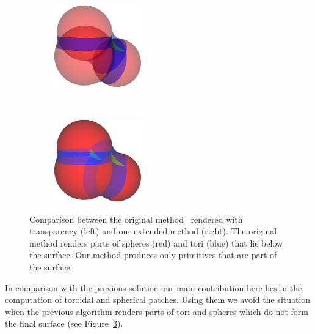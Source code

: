\begin{figure}[htp]
  \centering
  \begin{subfigure}[t]{0.48\columnwidth}
    \centering
    \includegraphics[width=1.5in]{image/cb-krone.png}
		\label{fig:cb-krone}
  \end{subfigure}%
  ~
  \begin{subfigure}[t]{0.48\columnwidth}
    \centering
    \includegraphics[width=1.5in]{image/cb-oit.png}
		\label{fig:cb-oit}
  \end{subfigure}
\caption{Comparison between the original method~\cite{krone2011parallel} rendered with transparency (left) and our extended method (right).
The original method renders parts of spheres (red) and tori (blue) that lie below the surface.
Our method produces only primitives that are part of the surface.
}
\end{figure}

In comparison with the previous solution our main contribution here lies in the computation of toroidal and spherical patches.
Using them we avoid the situation when the previous algorithm renders parts of tori and spheres which do not form the final surface (see Figure~\ref{fig:cb-oit}).


